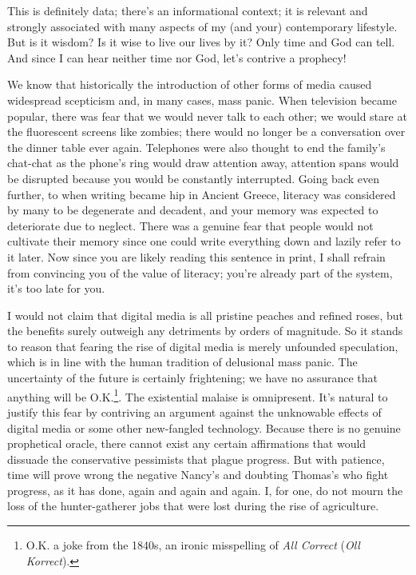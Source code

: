 This is definitely data; there's an informational context; it is relevant and strongly associated with many aspects of my (and your) contemporary lifestyle. But is it wisdom? Is it wise to live our lives by it? Only time and God can tell. And since I can hear neither time nor God, let's contrive a prophecy!

We know that historically the introduction of other forms of media caused widespread scepticism and, in many cases, mass panic. When television became popular, there was fear that we would never talk to each other; we would stare at the fluorescent screens like zombies; there would no longer be a conversation over the dinner table ever again. Telephones were also thought to end the family's chat-chat as the phone's ring would draw attention away, attention spans would be disrupted because you would be constantly interrupted. Going back even further, to when writing became hip in Ancient Greece, literacy was considered by many to be degenerate and decadent, and your memory was expected to deteriorate due to neglect. There was a genuine fear that people would not cultivate their memory since one could write everything down and lazily refer to it later. Now since you are likely reading this sentence in print, I shall refrain from convincing you of the value of literacy; you're already part of the system, it's too late for you.

I would not claim that digital media is all pristine peaches and refined roses, but the benefits surely outweigh any detriments by orders of magnitude. So it stands to reason that fearing the rise of digital media is merely unfounded speculation, which is in line with the human tradition of delusional mass panic. The uncertainty of the future is certainly frightening; we have no assurance that anything will be O.K.\footnote{O.K. a joke from the 1840s, an ironic misspelling of \textit{All Correct} (\textit{Oll Korrect}).}. The existential malaise is omnipresent. It's natural to justify this fear by contriving an argument against the unknowable effects of digital media or some other new-fangled technology. Because there is no genuine prophetical oracle, there cannot exist any certain affirmations that would dissuade the conservative pessimists that plague progress. But with patience, time will prove wrong the negative Nancy's and doubting Thomas's who fight progress, as it has done, again and again and again. I, for one, do not mourn the loss of the hunter-gatherer jobs that were lost during the rise of agriculture.

